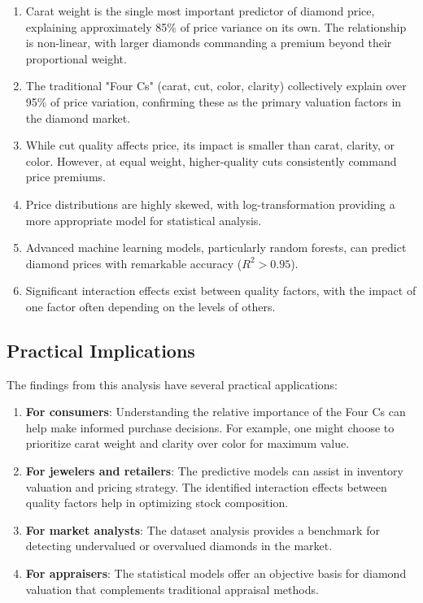 \documentclass[11pt,a4paper]{article}
\begin{document}
\begin{enumerate}
    \item Carat weight is the single most important predictor of diamond price, explaining approximately 85\% of price variance on its own. The relationship is non-linear, with larger diamonds commanding a premium beyond their proportional weight.
    
    \item The traditional "Four Cs" (carat, cut, color, clarity) collectively explain over 95\% of price variation, confirming these as the primary valuation factors in the diamond market.
    
    \item While cut quality affects price, its impact is smaller than carat, clarity, or color. However, at equal weight, higher-quality cuts consistently command price premiums.
    
    \item Price distributions are highly skewed, with log-transformation providing a more appropriate model for statistical analysis.
    
    \item Advanced machine learning models, particularly random forests, can predict diamond prices with remarkable accuracy ($R^2 > 0.95$).
    
    \item Significant interaction effects exist between quality factors, with the impact of one factor often depending on the levels of others.
\end{enumerate}

\subsection{Practical Implications}

The findings from this analysis have several practical applications:

\begin{enumerate}
    \item \textbf{For consumers}: Understanding the relative importance of the Four Cs can help make informed purchase decisions. For example, one might choose to prioritize carat weight and clarity over color for maximum value.
    
    \item \textbf{For jewelers and retailers}: The predictive models can assist in inventory valuation and pricing strategy. The identified interaction effects between quality factors help in optimizing stock composition.
    
    \item \textbf{For market analysts}: The dataset analysis provides a benchmark for detecting undervalued or overvalued diamonds in the market.
    
    \item \textbf{For appraisers}: The statistical models offer an objective basis for diamond valuation that complements traditional appraisal methods.
\end{enumerate}
\end{document}
